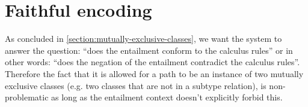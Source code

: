 \documentclass[a4paper]{article}
\begin{document}
 \section{Faithful encoding}
 As concluded in \ref{section:mutually-exclusive-classes},
 we want the system to answer the question:
 ``does the entailment conform to the calculus rules'' or in other words:
 ``does the negation of the entailment contradict the calculus rules''.
 Therefore the fact that it is allowed for a path to be an instance of
 two mutually exclusive classes (e.g. two classes that are not in a subtype relation),
 is non-problematic as long as the entailment context doesn't explicitly forbid this.

%
%

\end{document}
